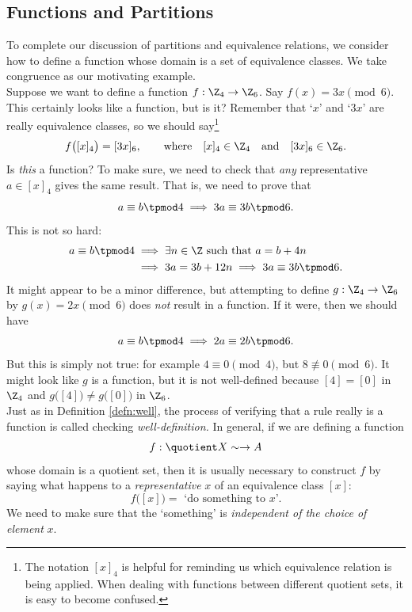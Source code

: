 \subsection{Functions and Partitions}

To complete our discussion of partitions and equivalence relations, we consider how to define a function whose domain is a set of equivalence classes. We take congruence as our motivating example.\\

Suppose we want to define a function $f:\Z_4\to\Z_6$. Say $f(x)=3x\pmod 6$. This certainly looks like a function, but is it? Remember that `$x$' and `$3x$' are really equivalence classes, so we should say\footnote{The notation $[x]_4$ is helpful for reminding us which equivalence relation is being applied. When dealing with functions between different quotient sets, it is easy to become confused.}
\[f\bigl([x]_4\bigr)=[3x]_6,\qquad\text{where}\quad [x]_4\in\Z_4\quad\text{and}\quad [3x]_6\in\Z_6.\]
Is \emph{this} a function? To make sure, we need to check that \emph{any} representative $a\in[x]_4$ gives the same result. That is, we need to prove that
\[a\equiv b\tpmod 4\implies 3a\equiv 3b\tpmod 6.\]
This is not so hard:
\begin{align*}
a\equiv b\tpmod 4&\implies \exists n\in\Z\text{ such that }a=b+4n\\
&\implies 3a=3b+12n\implies 3a\equiv 3b\tpmod 6.
\end{align*}
It might appear to be a minor difference, but attempting to define $g:\Z_4\to\Z_6$ by $g(x)=2x\pmod 6$ does \emph{not} result in a function. If it were, then we should have
\[a\equiv b\tpmod 4\implies 2a\equiv 2b\tpmod 6.\]
But this is simply not true: for example $4\equiv 0\pmod 4$, but $8\not\equiv 0\pmod 6$. It might look like $g$ is a function, but it is not well-defined because $[4]=[0]$ in $\Z_4$ and $g\bigl([4]\bigr)\neq g\bigl([0]\bigr)$ in $\Z_6$.\\

Just as in Definition \ref{defn:well}, the process of verifying that a rule really is a function is called checking \emph{well-definition.} In general, if we are defining a function
\[f:\quotient X\sim\to A\]
whose domain is a quotient set, then it is usually necessary to construct $f$ by saying what happens to a \emph{representative} $x$ of an equivalence class $[x]$:
\[f\bigl([x]\bigr)=\text{ `do something to $x$'.}\tag*{($\ast$)}\]
We need to make sure that the `something' is \emph{independent of the choice of element} $x$.

